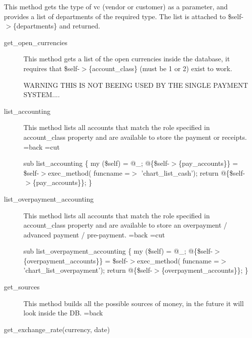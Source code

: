 \begin{description}
\begin{description}
\begin{description}
\begin{description}
\begin{description}
\begin{description}
\begin{description}
\begin{description}
\begin{description}
\begin{description}
This method gets the type of vc (vendor or customer) as a parameter, and provides a list of departments
of the required type.
The list is attached to \$self-$>$\{departments\} and returned.

\end{description}
\begin{description}

\item[{get\_open\_currencies}] \mbox{}

This method gets a list of the open currencies inside the database, it requires that  
\$self-$>$\{account\_class\} (must be 1 or 2)  exist to work.



WARNING THIS IS NOT BEEING USED BY THE SINGLE PAYMENT SYSTEM....

\end{description}
\begin{description}

\item[{list\_accounting}] \mbox{}

This method lists all accounts that match the role specified in account\_class property and
are available to store the payment or receipts. 
=back
=cut



sub list\_accounting \{
 my (\$self) = @\_;
 @\{\$self-$>$\{pay\_accounts\}\} = \$self-$>$exec\_method( funcname =$>$ 'chart\_list\_cash');
 return @\{\$self-$>$\{pay\_accounts\}\}; 
\}


\item[{list\_overpayment\_accounting}] \mbox{}

This method lists all accounts that match the role specified in account\_class property and
are available to store an overpayment / advanced payment / pre-payment. 
=back
=cut



sub list\_overpayment\_accounting \{
 my (\$self) = @\_;
 @\{\$self-$>$\{overpayment\_accounts\}\} = \$self-$>$exec\_method( funcname =$>$ 'chart\_list\_overpayment');
 return @\{\$self-$>$\{overpayment\_accounts\}\}; 
\}


\item[{get\_sources}] \mbox{}

This method builds all the possible sources of money,
in the future it will look inside the DB. 
=back


\item[{get\_exchange\_rate(currency, date)}] \mbox{}


\end{description}
\end{description}
\end{description}
\end{description}
\end{description}
\end{description}
\end{description}
\end{description}
\end{description}
\end{description}

